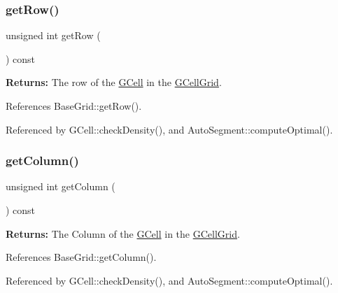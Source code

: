 \mbox{\label{classKatabatic_1_1GCell_ad26f8bcf642c2620ac525cc04c8376c0}} 
\subsubsection{\texorpdfstring{get\+Row()}{getRow()}}
{\footnotesize\ttfamily unsigned int get\+Row (\begin{DoxyParamCaption}{ }\end{DoxyParamCaption}) const}

{\bfseries Returns\+:} The row of the \mbox{\hyperlink{classKatabatic_1_1GCell}{G\+Cell}} in the \mbox{\hyperlink{classKatabatic_1_1GCellGrid}{G\+Cell\+Grid}}. 

References Base\+Grid\+::get\+Row().



Referenced by G\+Cell\+::check\+Density(), and Auto\+Segment\+::compute\+Optimal().

\mbox{\label{classKatabatic_1_1GCell_ac5b1a776c3eafa7f68d31292615011fa}} 
\subsubsection{\texorpdfstring{get\+Column()}{getColumn()}}
{\footnotesize\ttfamily unsigned int get\+Column (\begin{DoxyParamCaption}{ }\end{DoxyParamCaption}) const}

{\bfseries Returns\+:} The Column of the \mbox{\hyperlink{classKatabatic_1_1GCell}{G\+Cell}} in the \mbox{\hyperlink{classKatabatic_1_1GCellGrid}{G\+Cell\+Grid}}. 

References Base\+Grid\+::get\+Column().



Referenced by G\+Cell\+::check\+Density(), and Auto\+Segment\+::compute\+Optimal().

\mbox{\label{classKatabatic_1_1GCell_a633722329744550b6da94c3b6fb97484}} 
